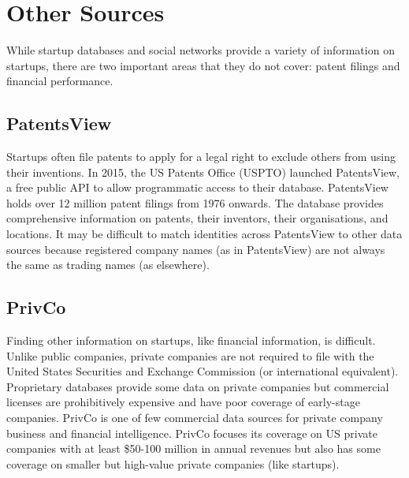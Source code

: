 \section{Other Sources}

While startup databases and social networks provide a variety of information on startups, there are two important areas that they do not cover: patent filings and financial performance.

\subsection{PatentsView}

Startups often file patents to apply for a legal right to exclude others from using their inventions. In 2015, the US Patents Office (USPTO) launched PatentsView, a free public API to allow programmatic access to their database. PatentsView holds over 12 million patent filings from 1976 onwards. The database provides comprehensive information on patents, their inventors, their organisations, and locations. It may be difficult to match identities across PatentsView to other data sources because registered company names (as in PatentsView) are not always the same as trading names (as elsewhere).

\subsection{PrivCo}

Finding other information on startups, like financial information, is difficult. Unlike public companies, private companies are not required to file with the United States Securities and Exchange Commission (or international equivalent). Proprietary databases provide some data on private companies but commercial licenses are prohibitively expensive and have poor coverage of early-stage companies. PrivCo is one of few commercial data sources for private company business and financial intelligence. PrivCo focuses its coverage on US private companies with at least \$50-100 million in annual revenues but also has some coverage on smaller but high-value private companies (like startups).
